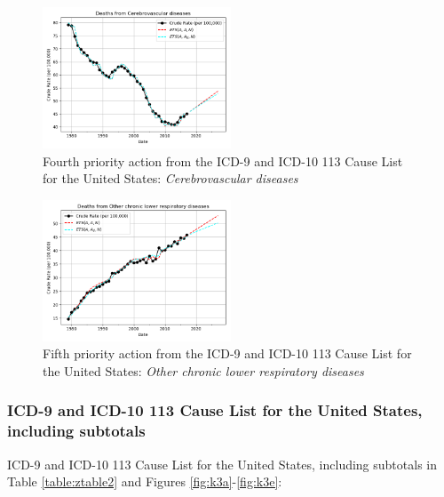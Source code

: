 \documentclass[10pt, a4paper, twocolumn]{IEEEconf}
\begin{document}
\begin{figure}[H]
  \centering
  \includegraphics[width=0.5\textwidth]{results/US_ICD_113_SELECTED_CAUSES_LEAVES/Cerebrovascular_diseases_ets.png}
  \caption{Fourth priority action from the ICD-9 and ICD-10 113 Cause List for the United States: \textit{Cerebrovascular diseases}}\label{fig:k2d}
\end{figure}

\begin{figure}[H]
  \centering
  \includegraphics[width=0.5\textwidth]{results/US_ICD_113_SELECTED_CAUSES_LEAVES/Other_chronic_lower_respiratory_diseases_ets.png}
  \caption{Fifth priority action from the ICD-9 and ICD-10 113 Cause List for the United States: \textit{Other chronic lower respiratory diseases}}\label{fig:k2e}
\end{figure}

\clearpage

\subsubsection{ICD-9 and ICD-10 113 Cause List for the United States, including subtotals}

ICD-9 and ICD-10 113 Cause List for the United States, including subtotals in Table \ref{table:ztable2} and Figures \ref{fig:k3a}-\ref{fig:k3e}:
\end{document}
